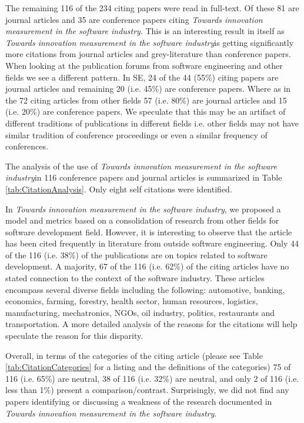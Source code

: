 \documentclass[sigplan]{acmart}
\newcommand{\theArticle}{\textit{Towards innovation measurement in the software industry}}
\begin{document}

The remaining 116 of the 234 citing papers were read in full-text. Of these 81 are journal articles and 35 are conference papers citing \theArticle. This is an interesting result in itself as \theArticle is getting significantly more citations from journal articles and grey-literature than conference papers. When looking at the publication forums from software engineering and other fields we see a different pattern. In SE, 24 of the 44 (55\%) citing papers are journal articles and remaining 20 (i.e. 45\%) are conference papers. Where as in the 72 citing articles from other fields 57 (i.e. 80\%) are journal articles and 15 (i.e. 20\%) are conference papers. We speculate that this may be an artifact of different traditions of publications in different fields i.e. other fields may not have similar tradition of conference proceedings or even a similar frequency of conferences.


The analysis of the use of \theArticle in 116 conference papers and journal articles is summarized in Table \ref{tab:CitationAnalysis}. Only eight self citations were identified. 

In \theArticle, we proposed a model and metrics based on a consolidation of research from other fields for software development field. However, it is interesting to observe that the article has been cited frequently in literature from outside software engineering. Only 44 of the 116 (i.e. 38\%) of the publications are on topics related to software development. A majority, 67 of the 116 (i.e. 62\%) of the citing articles have no stated connection to the context of the software industry. These articles encompass several diverse fields including the following: automotive, banking, economics, farming, forestry, health sector, human resources, logistics, manufacturing, mechatronics, NGOs, oil industry, politics, restaurants and transportation.  A more detailed analysis of the reasons for the citations will help speculate the reason for this disparity.

Overall, in terms of the categories of the citing article (please see Table \ref{tab:CitationCategories} for a listing and the definitions of the categories) 75 of 116 (i.e. 65\%) are neutral, 38 of 116 (i.e. 32\%) are neutral, and only 2 of 116 (i.e. less than 1\%) present a comparison/contrast. Surprisingly, we did not find any papers identifying or discussing a weakness of the research documented in \theArticle.
 
\end{document}
